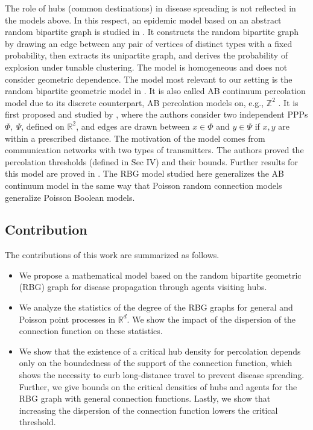  
 The role of hubs (common destinations) in disease spreading is not reflected in the models above. In this respect, an epidemic model based on an abstract random bipartite graph is studied in \cite{britton2008epidemics}. It constructs the random bipartite graph by drawing an edge between any pair of vertices of distinct types with a fixed probability, then extracts its unipartite graph, and derives the probability of explosion under tunable clustering. The model is homogeneous and does not consider geometric dependence. The model most relevant to our setting is the random bipartite geometric model in \cite{iyer2012percolation,penrose_2014}. It is also called AB continuum percolation model due to its discrete counterpart, AB percolation models on, e.g., $\mathbb{Z}^2$ \cite[Chapter 12]{grimmett1999percolation}. It is first proposed and studied by \cite{iyer2012percolation}, where the authors consider two independent PPPs $\Phi,~\Psi$, defined on $\mathbb{R}^2$, and edges are drawn between $x\in\Phi$ and $y\in \Psi$ if $x,y$ are within a prescribed distance. The motivation of the model comes from communication networks with two types of transmitters. The authors proved the percolation thresholds (defined in Sec IV) and their bounds. Further results for this model are proved in \cite{penrose_2014}. The RBG model studied here generalizes the AB continuum model in the same way that Poisson random connection models generalize Poisson Boolean models. 


\subsection{Contribution}
The contributions of this work are summarized as follows.
\begin{itemize}
    \item We propose a mathematical model based on the random bipartite geometric (RBG) graph for disease propagation through agents visiting hubs.
    \item We analyze the statistics of the degree of the RBG graphs for general and Poisson point processes in $\mathbb{R}^d$. We show the impact of the dispersion of the connection function on these statistics.
    \item We show that the existence of a critical hub density for percolation depends only on the boundedness of the support of the connection function, which shows the necessity to curb long-distance travel to prevent disease spreading. Further, we give bounds on the critical densities of hubs and agents for the RBG graph with general connection functions. Lastly, we show that increasing the dispersion of the connection function lowers the critical threshold.
\end{itemize}

